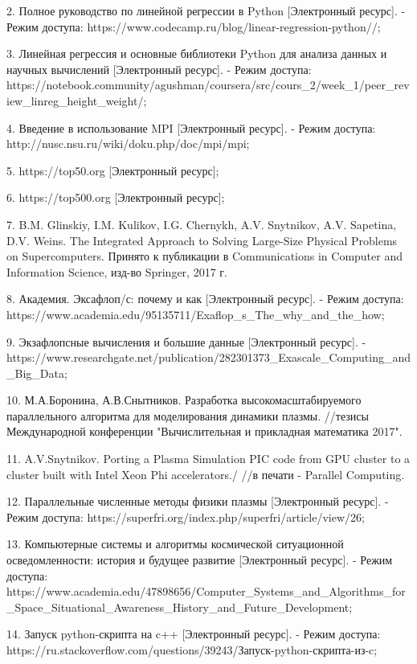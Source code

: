 \documentclass{article}
\begin{document}
2. Полное руководство по линейной регрессии в Python [Электронный ресурс].
   - Режим доступа: https://www.codecamp.ru/blog/linear-regression-python//;

3. Линейная регрессия и основные библиотеки Python для анализа данных и научных вычислений [Электронный ресурс].
   - Режим доступа: https://notebook.community/agushman/coursera/src/cours_2/week_1/peer_review_linreg_height_weight/;

4. Введение в использование MPI [Электронный ресурс].
   - Режим доступа: http://nusc.nsu.ru/wiki/doku.php/doc/mpi/mpi;

5. https://top50.org [Электронный ресурс];

6. https://top500.org [Электронный ресурс];

7. B.M. Glinskiy, I.M. Kulikov, I.G. Chernykh, A.V. Snytnikov, A.V. Sapetina, D.V. Weins.  The Integrated Approach to Solving Large-Size Physical Problems on Supercomputers.
   Принято к публикации в Communications in Computer and Information Science, изд-во Springer, 2017 г.

8. Академия. Эксафлоп/с: почему и как [Электронный ресурс].
   - Режим доступа: https://www.academia.edu/95135711/Exaflop_s_The_why_and_the_how;

9. Экзафлопсные вычисления и большие данные [Электронный ресурс].
   - https://www.researchgate.net/publication/282301373_Exascale_Computing_and_Big_Data;

10. М.А.Боронина, А.В.Снытников. Разработка высокомасштабируемого параллельного алгоритма для моделирования динамики плазмы.
   //тезисы Международной конференции "Вычислительная и прикладная математика 2017".

11. A.V.Snytnikov.  Porting a Plasma Simulation PIC code from GPU cluster to a cluster built with Intel Xeon Phi accelerators./
   //в печати -  Parallel Computing.

12. Параллельные численные методы физики плазмы [Электронный ресурс].
   - Режим доступа: https://superfri.org/index.php/superfri/article/view/26;

13. Компьютерные системы и алгоритмы космической ситуационной осведомленности: история и будущее развитие [Электронный ресурс].
   - Режим доступа: https://www.academia.edu/47898656/Computer_Systems_and_Algorithms_for_Space_Situational_Awareness_History_and_Future_Development;

14. Запуск python-скрипта на c++ [Электронный ресурс].
   - Режим доступа: https://ru.stackoverflow.com/questions/39243/Запуск-python-скрипта-из-c;
\end{document}
